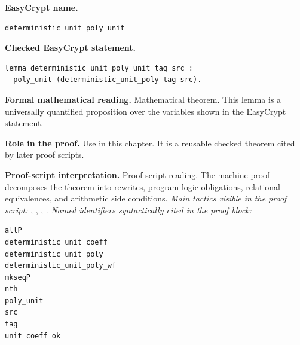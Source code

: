 \begin{formaltheorem}
\noindent\textbf{EasyCrypt name.}
\begin{lstlisting}[language=EasyCrypt,basicstyle=\ttfamily\scriptsize]
deterministic_unit_poly_unit
\end{lstlisting}
\noindent\textbf{Checked EasyCrypt statement.}
\begin{lstlisting}[language=EasyCrypt,basicstyle=\ttfamily\scriptsize]
lemma deterministic_unit_poly_unit tag src :
  poly_unit (deterministic_unit_poly tag src).
\end{lstlisting}
\noindent\textbf{Formal mathematical reading.}
Mathematical theorem. This lemma is a universally quantified proposition over the variables shown in the EasyCrypt statement.

\noindent\textbf{Role in the proof.}
Use in this chapter. It is a reusable checked theorem cited by later proof scripts.

\noindent\textbf{Proof-script interpretation.}
Proof-script reading. The machine proof decomposes the theorem into rewrites, program-logic obligations, relational equivalences, and arithmetic side conditions.
\emph{Main tactics visible in the proof script:} , , , .
\emph{Named identifiers syntactically cited in the proof block:}
\begin{lstlisting}[language=EasyCrypt,basicstyle=\ttfamily\scriptsize]
allP
deterministic_unit_coeff
deterministic_unit_poly
deterministic_unit_poly_wf
mkseqP
nth
poly_unit
src
tag
unit_coeff_ok
\end{lstlisting}

\end{formaltheorem}

